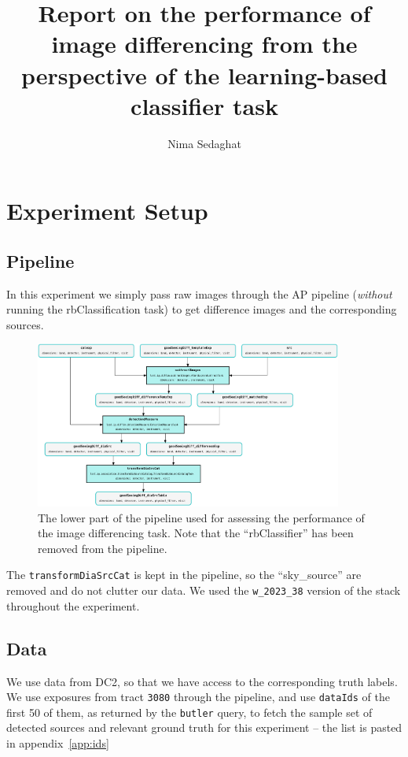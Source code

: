 \documentclass[DM,authoryear,toc]{lsstdoc}
\title{Report on the performance of image differencing from the perspective of the learning-based classifier task}
\author{%
Nima Sedaghat
}
\date{\vcsDate}
\begin{document}
\maketitle


\section{Experiment Setup}
\subsection{Pipeline}
In this experiment we simply pass raw images through the AP pipeline (\emph{without} running the rbClassification task) to get difference images and the corresponding sources.

\begin{figure}[h]
  \centering
  \includegraphics[width=0.9\textwidth]{pipeline.png}
  \caption{The lower part of the pipeline used for assessing the performance of the image differencing task. Note that the ``rbClassifier'' has been removed from the pipeline.}
  \label{fig:exposure_hist}
\end{figure}

The \texttt{transformDiaSrcCat} is kept in the pipeline, so the ``sky\_source'' are removed and do not clutter our data.
We used the \texttt{w\_2023\_38} version of the stack throughout the experiment.

\subsection{Data}
We use data from DC2, so that we have access to the corresponding truth labels. We use exposures from tract \texttt{3080} through the pipeline, and use \texttt{dataIds} of the first 50 of them, as returned by the \texttt{butler} query, to fetch the sample set of detected sources and relevant ground truth for this experiment -- the list is pasted in appendix~\ref{app:ids}
\end{document}

